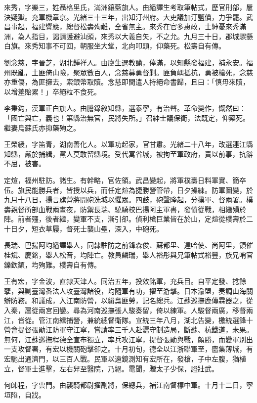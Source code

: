 \begin{pinyinscope}
來秀，字樂三，姓聶格里氏，滿洲鑲藍旗人。由繙譯生考取筆帖式，歷官刑部，屢決疑獄。充軍機章京。光緒三十三年，出知汀州府。大吏議加汀鹽價，力爭罷。武昌事起，福建響應，總督松壽殉難，全省無主。來秀在官多惠政，士紳憂來秀滿洲，為人指目，謁請護避汕頭，來秀以大義自矢，不之允。九月三十日，郡城驟懸白旗。來秀知事不可回，朝服坐大堂，北向叩頭，仰藥死。松壽自有傳。

劉念慈，字晉芝，湖北鍾祥人。由廩生選教諭，俸滿，以知縣發福建，補永安。福州既亂，土匪倚山險，聚眾數百人，念慈募勇督剿。匪負嵎抵抗，勇被槍死，念慈亦重傷，為匪擁去，索銀幣取贖。念慈即間遣人持絕命書歸，且曰：「慎毋來贖，以增羞貽累！」卒絕粒不食死。

李秉鈞，漢軍正白旗人。由謄錄敘知縣，選泰寧，有治聲。革命變作，慨然曰：「國亡與亡，義也！第縣治無官，民將失所。」召紳士議保衛，法既定，仰藥死。繼妻烏蘇氏亦抑藥殉之。

王榮綬，字笛青，湖南善化人。以軍功起家，官甘肅。光緒二十八年，改選連江縣知縣，嚴於捕緝，黨人莫敢留縣境。受代寓省城，被拘至軍政府，責以前事，抗辭不屈，被害。

定煊，福州駐防。諸生。有幹略，官佐領。武昌變起，將軍樸壽日料軍實、簡卒伍。旗民能勝兵者，皆授以兵，而任定煊為捷勝營管帶，日夕操練。防軍圖變，於九月十八日，揚言旗營將開砲洗城以懼眾。四鼓，砲聲隆起，分撲軍、督兩署。樸壽親督所部血戰兩晝夜，防禦長瑞、驍騎校巴揚阿主軍書，發憤從戰，相繼殞於陣。前者殭，後者繼，變軍不支，漸引卻。偵利槍巨業皆在於山，定煊從樸壽於二十日夕，短衣草屨，督死士襲山壘，深入，中砲死。

長瑞、巴揚阿均繙譯舉人，同隸駐防之前鋒森俊、蘇都里、達哈使、尚阿里，領催桂斌、慶銘，舉人松音，均陣亡。教員麟瑞，舉人裕彤與兄筆帖式裕豐，族兄哨官鑠欽額，均殉難。樸壽自有傳。

王有宏，字金波，直隸天津人。同治五年，投效銘軍，充兵目。自平定發、捻餘孽，與剿臺灣番法人攻臺灣諸役，均隨軍有功，擢至游擊。日本渝盟，奏調山海關辦防務。和議成，入江南防營，以緝梟匪勞，記名總兵。江蘇巡撫鹿傳霖器之，從入秦，扈從兩宮回鑾。尋為河南巡撫張人駿奏留，倚以練軍。人駿督兩廣，移督兩江，皆從。管江南緝捕營，兼統總督衛隊。宣統三年八月，湖北告變，檄統選鋒十營會提督張勛江防軍守江寧，嘗請率三千人赴滬守制造局，斷蘇、杭鐵道，未果。無何，江蘇巡撫程德全宣布獨立，率兵攻江寧，提督張勛與戰，頗勝，而變軍別出一支攻督署，有宏以機關砲擊卻之。十月初旬，德全以江浙聯軍至，麕集薄城，有宏馳出通濟門，以三百人戰。民軍以遠鏡測知有宏所在，發槍，子中左腹，猶植立，督軍士進擊，左右舁至醫院，乃絕。電聞，贈太子少保，謚壯武。

何師程，字雲門。由襲騎都尉擢副將，保總兵，補江南督標中軍。十月十二日，寧垣陷，自戕。


\end{pinyinscope}
